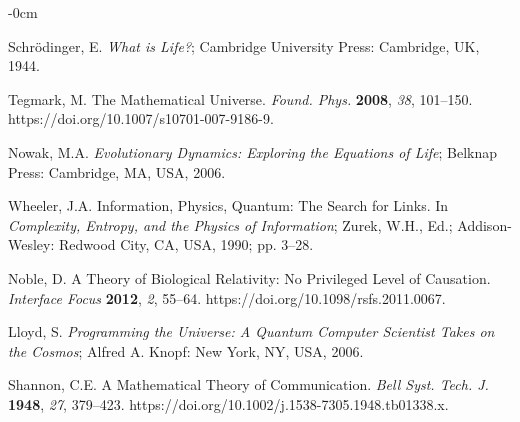 \documentclass[entropy,article,submit,pdftex,moreauthors]{Definitions/mdpi}
\begin{document}
\begin{adjustwidth}{-\extralength}{0cm}



%

\begin{thebibliography}{999}
Schrödinger, E. \textit{What is Life?}; Cambridge University Press: Cambridge, UK, 1944.

Tegmark, M. The Mathematical Universe. \textit{Found. Phys.} \textbf{2008}, \textit{38}, 101–150. https://doi.org/10.1007/s10701-007-9186-9.

Nowak, M.A. \textit{Evolutionary Dynamics: Exploring the Equations of Life}; Belknap Press: Cambridge, MA, USA, 2006.

Wheeler, J.A. Information, Physics, Quantum: The Search for Links. In \textit{Complexity, Entropy, and the Physics of Information}; Zurek, W.H., Ed.; Addison-Wesley: Redwood City, CA, USA, 1990; pp. 3–28.

Noble, D. A Theory of Biological Relativity: No Privileged Level of Causation. \textit{Interface Focus} \textbf{2012}, \textit{2}, 55–64. https://doi.org/10.1098/rsfs.2011.0067.

Lloyd, S. \textit{Programming the Universe: A Quantum Computer Scientist Takes on the Cosmos}; Alfred A. Knopf: New York, NY, USA, 2006.

Shannon, C.E. A Mathematical Theory of Communication. \textit{Bell Syst. Tech. J.} \textbf{1948}, \textit{27}, 379–423. https://doi.org/10.1002/j.1538-7305.1948.tb01338.x.


\end{thebibliography}
\end{adjustwidth}
\end{document}
